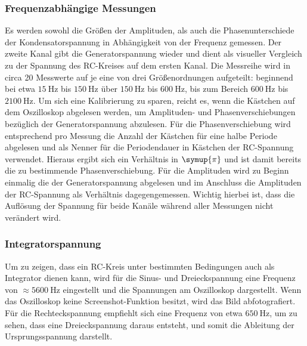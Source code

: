 \subsubsection{Frequenzabhängige Messungen}
Es werden sowohl die Größen der Amplituden, als auch die Phasenunterschiede der Kondensatorspannung in Abhängigkeit von der Frequenz gemessen.
Der zweite Kanal gibt die Generatorspannung wieder und dient als visueller Vergleich zu der Spannung des RC-Kreises auf dem ersten Kanal.
Die Messreihe wird in circa 20 Messwerte auf je eine von drei Größenordnungen aufgeteilt: beginnend bei etwa $\SI{15}{\hertz}$ bis $\SI{150}{\hertz}$ über $\SI{150}{\hertz}$ bis $\SI{600}{\hertz}$, bis zum Bereich
$\SI{600}{\hertz}$ bis $\SI{2100}{\hertz}$.
Um sich eine Kalibrierung zu sparen, reicht es, wenn die Kästchen auf dem Oszilloskop abgelesen werden, um Amplituden- und Phasenverschiebungen
bezüglich der Generatorspannung abzulesen. Für die Phasenverschiebung wird entsprechend pro Messung die Anzahl der Kästchen für eine halbe Periode
abgelesen und als Nenner für die Periodendauer in Kästchen der RC-Spannung verwendet. Hieraus ergibt sich ein Verhältnis in $\symup{\pi}$ und ist damit bereits die zu bestimmende Phasenverschiebung.
Für die Amplituden wird zu Beginn einmalig die der Generatorspannung abgelesen und im Anschluss die Amplituden der RC-Spannung
als Verhältnis dagegengemessen. Wichtig hierbei ist, dass die Auflösung der Spannung für beide Kanäle während aller Messungen
nicht verändert wird.

\subsubsection{Integratorspannung}
Um zu zeigen, dass ein RC-Kreis unter bestimmten Bedingungen auch als Integrator dienen kann, wird für die Sinus- und Dreieckspannung
eine Frequenz von $\approx \SI{5600}{\hertz}$ eingestellt und die Spannungen am Oszilloskop dargestellt. Wenn das Oszilloskop keine Screenshot-Funktion besitzt,
wird das Bild abfotografiert.
Für die Rechteckspannung empfiehlt sich eine Frequenz von etwa $\SI{650}{\hertz}$, um zu sehen, dass eine Dreieckspannung daraus entsteht, und somit die Ableitung
der Ursprungsspannung darstellt.